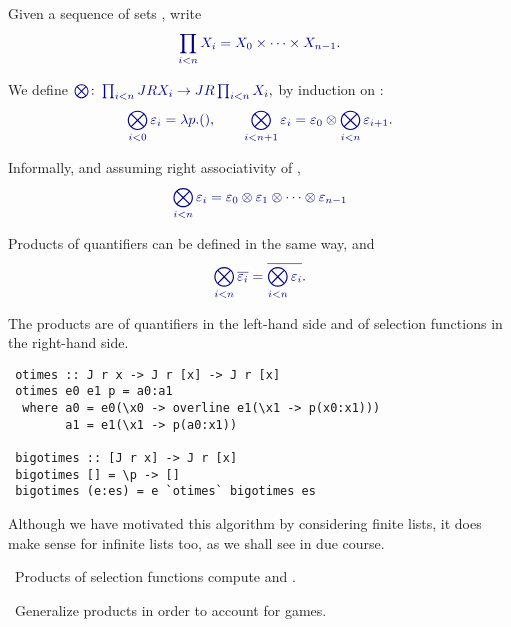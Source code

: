 \documentclass%
[%
Screen4to3,
]{foils}
\begin{document}

Given a sequence of sets ,
write
\[
\darkblue{\prod_{i<n} X_i = X_0 \times \cdots \times X_{n-1}}.
\]

\vfill

We define
$
\darkblue{\bigotimes \colon \prod_{i<n} J R X_i \to J R \prod_{i<n} X_i},
$
by induction on :
\[
  \darkblue{\bigotimes_{i < 0} \varepsilon_i  =  \lambda p.()}, \qquad
  \darkblue{\bigotimes_{i < n+1} \varepsilon_i   =  \varepsilon_0 \otimes \bigotimes_{i < n} \varepsilon_{i+1}}.
\]

\vfill

Informally, and assuming right associativity of \darkblue{$\otimes$}, 
\[
\darkblue{\bigotimes_{i < n} \varepsilon_i = \varepsilon_0 \otimes \varepsilon_1 \otimes \cdots \otimes \varepsilon_{n-1}}
\]

Products of quantifiers can be defined in the same way, and 
\[
\darkblue{\bigotimes_{i < n} \overline{\varepsilon_i} 
= \overline{\bigotimes_{i < n} \varepsilon_i}}.
\]

\vfill

The products are of quantifiers in the left-hand side and
of selection functions in the right-hand side.


\begin{verbatim}
 otimes :: J r x -> J r [x] -> J r [x]
 otimes e0 e1 p = a0:a1
  where a0 = e0(\x0 -> overline e1(\x1 -> p(x0:x1)))
        a1 = e1(\x1 -> p(a0:x1))

 bigotimes :: [J r x] -> J r [x]
 bigotimes [] = \p -> []
 bigotimes (e:es) = e `otimes` bigotimes es 
\end{verbatim}

\vfill

Although we have motivated this algorithm by considering finite lists, 
it does make sense for infinite lists too, as we shall see in due course.


\vfill

~Products of selection functions compute  and . 

\vfill

~Generalize products in order to account for
 games.
\end{document}

